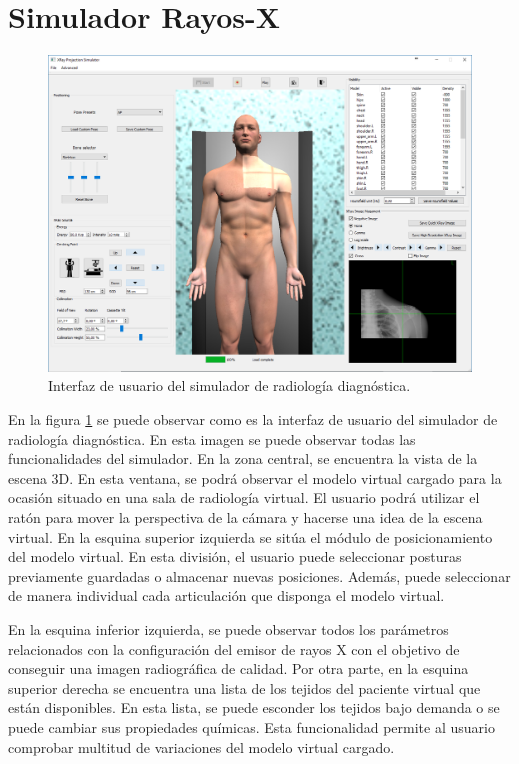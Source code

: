 \section{Simulador Rayos-X}
\label{result:xray}

\begin{figure}[h]
\centering
\includegraphics[width=0.95\linewidth]{IMG/simui.png}
\caption{\label{fig:simui} Interfaz de usuario del simulador de radiología diagnóstica. }
\end{figure}

En la figura \ref{fig:simui} se puede observar como es la interfaz de usuario del simulador de radiología diagnóstica. En esta imagen se puede observar todas las funcionalidades del simulador. 
En la zona central, se encuentra la vista de la escena 3D. En esta ventana, se podrá observar el modelo virtual cargado para la ocasión situado en una sala de radiología virtual. El usuario podrá utilizar el ratón para mover la perspectiva de la cámara y hacerse una idea de la escena virtual.
En la esquina superior izquierda se sitúa el módulo de posicionamiento del modelo virtual. En esta división, el usuario puede seleccionar posturas previamente guardadas o almacenar nuevas posiciones. Además, puede seleccionar de manera individual cada articulación que disponga el modelo virtual. 

En la esquina inferior izquierda, se puede observar todos los parámetros relacionados con la configuración del emisor de rayos X con el objetivo de conseguir una imagen radiográfica de calidad.
Por otra parte, en la esquina superior derecha se encuentra una lista de los tejidos del paciente virtual que están disponibles. En esta lista, se puede esconder los tejidos bajo demanda o se puede cambiar sus propiedades químicas. Esta funcionalidad permite al usuario comprobar multitud de variaciones del modelo virtual cargado.

